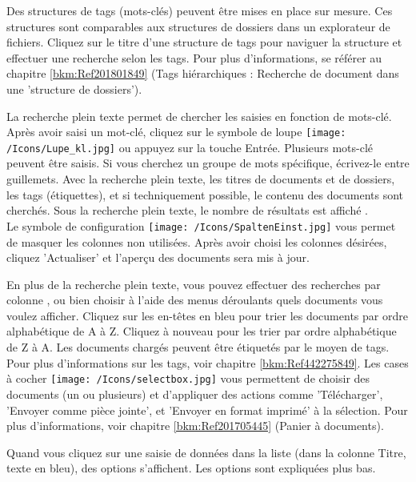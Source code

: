 Des structures de tags (mots-clés) peuvent être mises en place sur mesure. Ces structures sont comparables aux structures de dossiers dans un explorateur de fichiers. Cliquez sur le titre d'une structure de tags  pour naviguer la structure et effectuer une recherche selon les tags. Pour plus d'informations, se référer au chapitre \ref{bkm:Ref201801849} (Tags hiérarchiques : Recherche de document dans une 'structure de dossiers'). \newline

La recherche plein texte  permet de chercher les saisies en fonction de mots-clé. Après avoir saisi un mot-clé, cliquez sur le symbole de loupe \texttt{[image: /Icons/Lupe\_kl.jpg]}  ou appuyez sur la touche Entrée. Plusieurs mots-clé peuvent être saisis. Si vous cherchez un groupe de mots spécifique, écrivez-le entre guillemets. Avec la recherche plein texte, les titres de documents et de dossiers, les tags (étiquettes), et si techniquement possible, le contenu des documents sont cherchés. Sous la recherche plein texte, le nombre de résultats est affiché .\\
Le symbole de configuration \texttt{[image: /Icons/SpaltenEinst.jpg]}  vous permet de masquer les colonnes non utilisées. Après avoir choisi les colonnes désirées, cliquez 'Actualiser' et l'aperçu des documents sera mis à jour. \newline

En plus de la recherche plein texte, vous pouvez effectuer des recherches par colonne , ou bien choisir à l'aide des menus déroulants quels documents vous voulez afficher. Cliquez sur les en-têtes en bleu pour trier les documents par ordre alphabétique de A à Z. Cliquez à nouveau pour les trier par ordre alphabétique de Z à A. Les documents chargés peuvent être étiquetés par le moyen de tags. Pour plus d'informations sur les tags, voir chapitre \ref{bkm:Ref442275849}.\newline
Les cases à cocher \texttt{[image: /Icons/selectbox.jpg]}  vous permettent de choisir des documents (un ou plusieurs) et d'appliquer des actions comme 'Télécharger', 'Envoyer comme pièce jointe', et 'Envoyer en format imprimé' à la sélection. Pour plus d'informations, voir chapitre \ref{bkm:Ref201705445} (Panier à documents).

Quand vous cliquez sur une saisie de données dans la liste  (dans la colonne Titre, texte en bleu), des options s'affichent. Les options sont expliquées plus bas.

